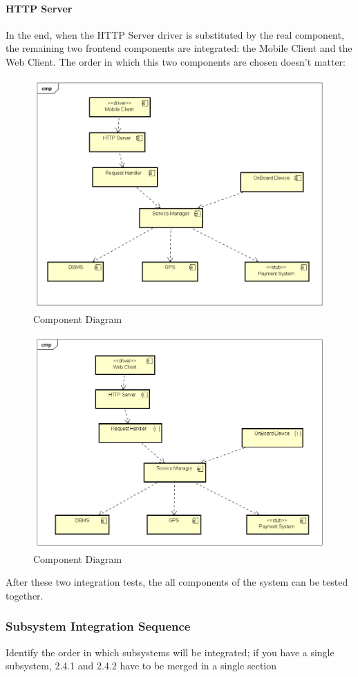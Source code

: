\paragraph{HTTP Server}
In the end, when the HTTP Server driver is substituted by the real component, the remaining two frontend components are integrated: the Mobile Client and the Web Client. The order in which this two components are chosen doesn't matter:
\begin{figure}[H]	
	\centering
	\includegraphics[width=\textwidth]{img/HTTP_MobCli_int}
	\caption{Component Diagram}
\end{figure}

\begin{figure}[H]	
	\centering
	\includegraphics[width=\textwidth]{img/HTTP_WebCli_int}
	\caption{Component Diagram}
\end{figure}

After these two integration tests, the all components of the system can be tested together.

\subsubsection{Subsystem Integration Sequence} Identify the order in which subsystems will be integrated;  if you have a single subsystem, 2.4.1 and 2.4.2 have to be merged in a single section





